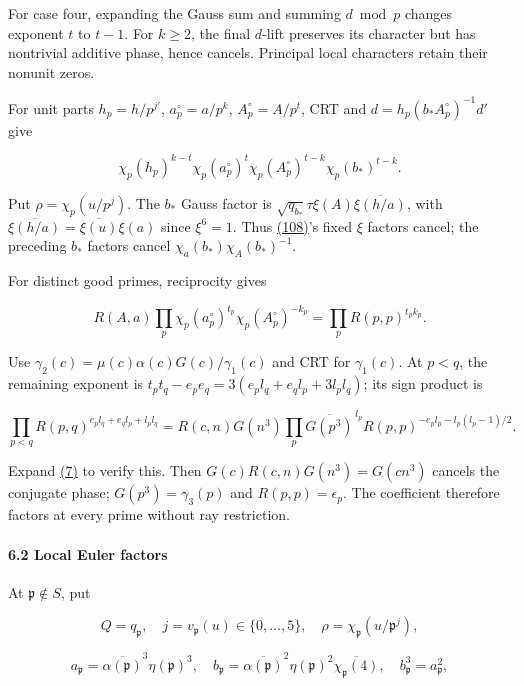 For case four, expanding the Gauss sum and summing \(d\bmod p\) changes exponent \(t\) to \(t-1\). For \(k\ge2\), the final \(d\)-lift preserves its character but has nontrivial additive phase, hence cancels. Principal local characters retain their nonunit zeros.

For unit parts \(h_p=h/p^{j'}\), \(a_p^\circ=a/p^k\), \(A_p^\circ=A/p^t\), CRT and \(d=h_p(b_*A_p^\circ)^{-1}d'\) give

\[
\chi_p(h_p)^{k-t}\chi_p(a_p^\circ)^t
\chi_p(A_p^\circ)^{t-k}\chi_p(b_*)^{t-k}.
\]

Put \(\rho=\chi_p(u/p^j)\). The \(b_*\) Gauss factor is \(\sqrt{q_{b_*}}\tau\xi(A)\overline{\xi(h/a)}\), with \(\overline{\xi(h/a)}=\overline{\xi(u)}\xi(a)\) since \(\xi^6=1\). Thus \protect\hyperlink{cf:eq:A.5}{(108)}'s fixed \(\xi\) factors cancel; the preceding \(b_*\) factors cancel \(\chi_a(b_*)\chi_A(b_*)^{-1}\).

For distinct good primes, reciprocity gives

\[
R(A,a)\prod_p\chi_p(a_p^\circ)^{t_p}\chi_p(A_p^\circ)^{-k_p}
=\prod_pR(p,p)^{t_pk_p}.
\]

Use \(\gamma_2(c)=\mu(c)\alpha(c)G(c)/\gamma_1(c)\) and CRT for \(\gamma_1(c)\). At \(p<q\), the remaining exponent is \(t_pt_q-e_pe_q=3(e_pl_q+e_ql_p+3l_pl_q)\); its sign product is

\[
\prod_{p<q}R(p,q)^{e_pl_q+e_ql_p+l_pl_q}
=R(c,n)G(n^3)\prod_p\overline{G(p^3)}^{\,l_p}
R(p,p)^{-e_pl_p-l_p(l_p-1)/2}.
\]

Expand \protect\hyperlink{cf:eq:A.2}{(7)} to verify this. Then \(G(c)R(c,n)G(n^3)=G(cn^3)\) cancels the conjugate phase; \(G(p^3)=\gamma_3(p)\) and \(R(p,p)=\epsilon_p\). The coefficient therefore factors at every prime without ray restriction.

\hypertarget{cf:sec:A.3}{}

\label{cf:sec:A.3}

\hypertarget{local-euler-factors}{%
\paragraph{6.2 Local Euler factors}\label{local-euler-factors}}

At \(\mathfrak p\notin S\), put

\[
Q=q_{\mathfrak p},\quad j=v_{\mathfrak p}(u)\in\{0,\ldots,5\},\quad
\rho=\chi_{\mathfrak p}(u/\mathfrak p^j),
\]

\[
a_{\mathfrak p}=\overline{\alpha(\mathfrak p)}^3\eta(\mathfrak p)^3,
\quad b_{\mathfrak p}=\overline{\alpha(\mathfrak p)}^2\eta(\mathfrak p)^2
\overline{\chi_{\mathfrak p}(4)},\quad b_{\mathfrak p}^3=a_{\mathfrak p}^2,
\]

